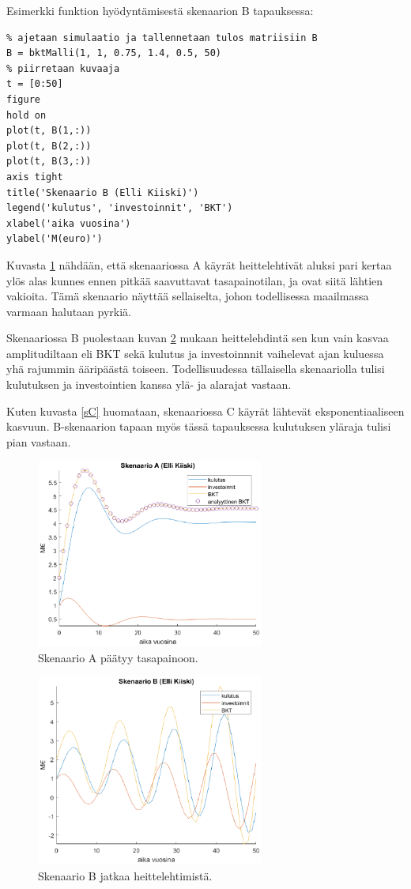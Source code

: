 \documentclass[a4paper,11pt]{article}
\begin{document}
{Esimerkki funktion hyödyntämisestä skenaarion B tapauksessa:

\begin{lstlisting}
% ajetaan simulaatio ja tallennetaan tulos matriisiin B
B = bktMalli(1, 1, 0.75, 1.4, 0.5, 50)
% piirretaan kuvaaja
t = [0:50]
figure
hold on
plot(t, B(1,:))
plot(t, B(2,:))
plot(t, B(3,:))
axis tight
title('Skenaario B (Elli Kiiski)')
legend('kulutus', 'investoinnit', 'BKT')
xlabel('aika vuosina')
ylabel('M(euro)')
\end{lstlisting}

Kuvasta \ref{sA} nähdään, että skenaariossa A käyrät heittelehtivät aluksi pari kertaa ylös alas kunnes ennen pitkää saavuttavat tasapainotilan, ja ovat siitä lähtien vakioita. Tämä skenaario näyttää sellaiselta, johon todellisessa maailmassa varmaan halutaan pyrkiä.

Skenaariossa B puolestaan kuvan \ref{sB} mukaan heittelehdintä sen kun vain kasvaa amplitudiltaan eli BKT sekä kulutus ja investoinnnit vaihelevat ajan kuluessa yhä rajummin ääripäästä toiseen. Todellisuudessa tällaisella skenaariolla tulisi kulutuksen ja investointien kanssa ylä- ja alarajat vastaan.

Kuten kuvasta \ref{sC} huomataan, skenaariossa C käyrät lähtevät eksponentiaaliseen kasvuun. B-skenaarion tapaan myös tässä tapauksessa kulutuksen yläraja tulisi pian vastaan.

\begin{figure}
    \centering
    \includegraphics[width= 75mm]{kuva2-skenaarioA.eps}
    \caption{Skenaario A päätyy tasapainoon.}
    \label{sA}
\end{figure}

\begin{figure}
    \centering
    \includegraphics[width= 75mm]{kuva3-skenaarioB.eps}
    \caption{Skenaario B jatkaa heittelehtimistä.}
    \label{sB}
\end{figure}

}
\end{document}
